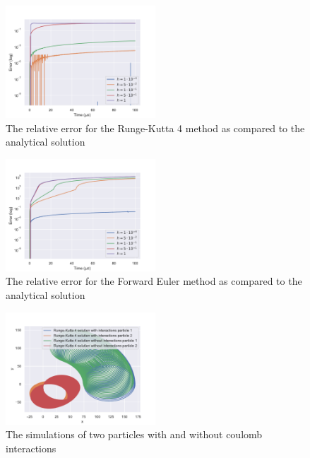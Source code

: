 \begin{figure}[h]
    \centering
    \includegraphics[width=0.5\textwidth]{data/runge_kutta_4_relativeError.pdf}
    \caption{The relative error for the Runge-Kutta 4 method as compared to the analytical solution}
    \label{fig:runge_kutta_relative_error}
\end{figure}
\begin{figure}[h]
    \centering
    \includegraphics[width=0.5\textwidth]{data/forward_euler_relativeError.pdf}
    \caption{The relative error for the Forward Euler method as compared to the analytical solution}
    \label{fig:forward_euler_relative_error}
\end{figure}
\begin{figure}[h]
    \centering
    \includegraphics[width=0.5\textwidth]{data/two_particles_2d.pdf}
    \caption{The simulations of two particles with and without coulomb interactions}
    \label{fig:two_particles_xy_plane}
\end{figure}
